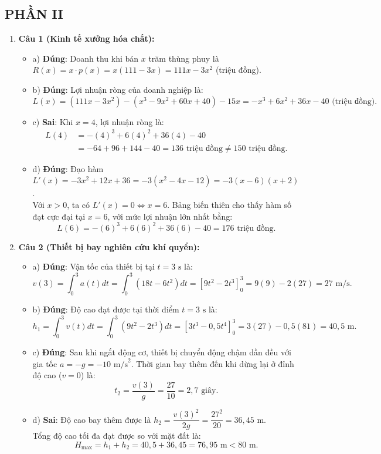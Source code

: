 \documentclass[12pt,a4paper]{article}
\begin{document}
\subsection*{PHẦN II}
\begin{enumerate}[label=\textbf{Câu \arabic*:}, leftmargin=*]
\item \textbf{Câu 1 (Kinh tế xưởng hóa chất):}
\begin{itemize}
    \item a) \textbf{Đúng}: Doanh thu khi bán $x$ trăm thùng phuy là $R(x) = x \cdot p(x) = x(111 - 3x) = 111x - 3x^2$ (triệu đồng).
    \item b) \textbf{Đúng}: Lợi nhuận ròng của doanh nghiệp là:
    $$L(x) = (111x - 3x^2) - (x^3 - 9x^2 + 60x + 40) - 15x = -x^3 + 6x^2 + 36x - 40\text{ (triệu đồng)}.$$
    \item c) \textbf{Sai}: Khi $x = 4$, lợi nhuận ròng là:
    \begin{align*}
    L(4) &= -(4)^3 + 6(4)^2 + 36(4) - 40 \\
    &= -64 + 96 + 144 - 40 = 136\text{ triệu đồng} \ne 150\text{ triệu đồng}.
    \end{align*}
    \item d) \textbf{Đúng}: Đạo hàm $L'(x) = -3x^2 + 12x + 36 = -3(x^2 - 4x - 12) = -3(x - 6)(x + 2)$.\\
    Với $x > 0$, ta có $L'(x) = 0 \iff x = 6$. Bảng biến thiên cho thấy hàm số đạt cực đại tại $x = 6$, với mức lợi nhuận lớn nhất bằng:
    $$L(6) = -(6)^3 + 6(6)^2 + 36(6) - 40 = 176\text{ triệu đồng}.$$
\end{itemize}

\item \textbf{Câu 2 (Thiết bị bay nghiên cứu khí quyển):}
\begin{itemize}
    \item a) \textbf{Đúng}: Vận tốc của thiết bị tại $t = 3\text{ s}$ là:
    $$v(3) = \int_0^3 a(t) dt = \int_0^3 (18t - 6t^2) dt = \left[ 9t^2 - 2t^3 \right]_0^3 = 9(9) - 2(27) = 27\text{ m/s}.$$
    \item b) \textbf{Đúng}: Độ cao đạt được tại thời điểm $t = 3\text{ s}$ là:
    $$h_1 = \int_0^3 v(t) dt = \int_0^3 (9t^2 - 2t^3) dt = \left[ 3t^3 - 0{,}5t^4 \right]_0^3 = 3(27) - 0{,}5(81) = 40{,}5\text{ m}.$$
    \item c) \textbf{Đúng}: Sau khi ngắt động cơ, thiết bị chuyển động chậm dần đều với gia tốc $a = -g = -10\text{ m/s}^2$. Thời gian bay thêm đến khi dừng lại ở đỉnh độ cao ($v = 0$) là:
    $$t_2 = \dfrac{v(3)}{g} = \dfrac{27}{10} = 2{,}7\text{ giây}.$$
    \item d) \textbf{Sai}: Độ cao bay thêm được là $h_2 = \dfrac{v(3)^2}{2g} = \dfrac{27^2}{20} = 36{,}45\text{ m}$.\\
    Tổng độ cao tối đa đạt được so với mặt đất là:
    $$H_{\max} = h_1 + h_2 = 40{,}5 + 36{,}45 = 76{,}95\text{ m} < 80\text{ m}.$$
\end{itemize}


\end{enumerate}
\end{document}

